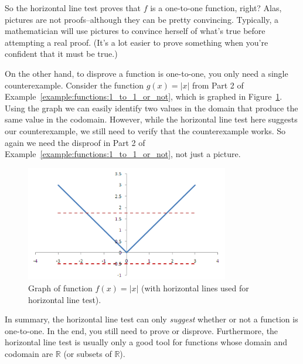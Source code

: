 \begin{rem}
So the horizontal line test proves that $f$ is a one-to-one function, right? Alas,  pictures are not proofs--although they can be pretty convincing. 
Typically, a mathematician will use pictures to convince herself of what's true before attempting a real proof. (It's a lot easier to prove something when you're confident that it must be true.)

On the other hand, to disprove a function is one-to-one, you only need a single counterexample.  Consider the function $g(x)= |x|$ from Part 2 of Example~\ref{example:functions:1_to_1_or_not}, which is graphed in Figure~\ref{fig:absx}.
Using the graph we can easily identify two values in the domain that produce the same value in the codomain.  However, while the horizontal line test here suggests our counterexample, we still need to verify that the counterexample works.  So again we need the disproof in Part 2 of Example~\ref{example:functions:1_to_1_or_not}, not just a picture.

\begin{figure}[h]
\includegraphics[width=3.5in]{images/absx.png}
\caption{Graph of function $f(x)=|x|$  (with horizontal lines used for horizontal line test).}
\label{fig:absx}
\end{figure}

In summary, the horizontal line test can only \emph{suggest} whether or not a function is one-to-one. In the end, you still need to prove or disprove.  Furthermore, the horizontal line test is usually only a good tool for functions whose domain and codomain are ${\mathbb R}$ (or subsets of ${\mathbb R}$).
\end{rem}    


